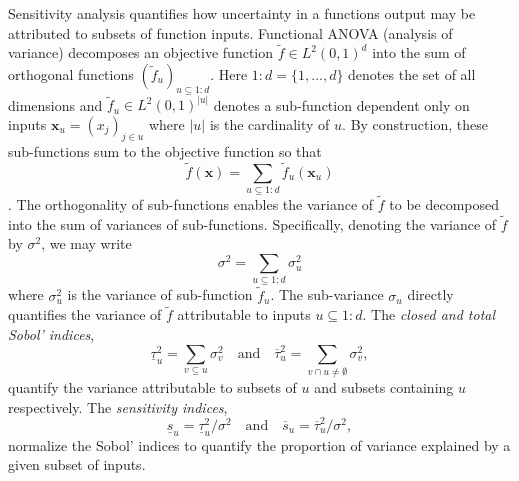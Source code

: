 \documentclass[graybox]{svmult}
\begin{document}
Sensitivity analysis quantifies how uncertainty in a functions output may be attributed to subsets of function inputs. Functional ANOVA (analysis of variance) decomposes an objective function $\tilde{f} \in L^2(0,1)^{d}$ into the sum of orthogonal functions $(\tilde{f}_u)_{u \subseteq 1:d}$. Here $1:d=\{1,\dots,d\}$ denotes the set of all dimensions and $\tilde{f}_u \in L^2(0,1)^{\lvert u \rvert}$ denotes a sub-function dependent only on inputs $\boldsymbol{x}_u = (x_j)_{j \in u}$ where $\lvert u \rvert$ is the cardinality of $u$. By construction, these sub-functions sum to the objective function so that
\begin{equation}
    \tilde{f}(\boldsymbol{x}) = \sum_{u \subseteq 1:d} \tilde{f}_u(\boldsymbol{x}_u) 
    \label{eq:fanova}
\end{equation}
\cite[Appendix A]{mcbook}. The orthogonality of sub-functions enables the variance of $\tilde{f}$ to be decomposed into the sum of variances of sub-functions. Specifically, denoting the variance of $\tilde{f}$ by $\sigma^2$, we may write
\begin{equation*}
    \sigma^2 = \sum_{u \subseteq 1:d} \sigma^2_u
\end{equation*}
where $\sigma^2_u$ is the variance of sub-function $\tilde{f}_u$. The sub-variance $\sigma_u$ directly quantifies the variance of $\tilde{f}$ attributable to inputs $u \subseteq 1:d$.  The \emph{closed and total Sobol' indices},
\begin{equation*}
    \underline{\tau}_u^2 = \sum_{v \subseteq u} \sigma^2_v \quad \text{and} \quad 
    \overline{\tau}_u^2 = \sum_{v \cap u \neq \emptyset} \sigma^2_v,
    \label{eq:sobol_indices}
\end{equation*}
quantify the variance attributable to subsets of $u$ and subsets containing $u$ respectively. The \emph{sensitivity indices},
\begin{equation*}
    \underline{s}_u = \underline{\tau}_u^2/\sigma^2 \quad \text{and} \quad 
    \overline{s}_u = \overline{\tau}_u^2/\sigma^2,
    \label{eq:sensitivity_indices_og}
\end{equation*}
normalize the Sobol' indices to quantify the proportion of variance explained by a given subset of inputs. 
\end{document}
